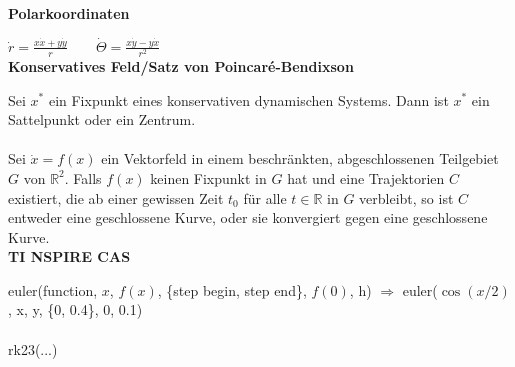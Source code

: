 \textbf{Polarkoordinaten}

$\dot{r} = \frac{x\dot{x} + y \dot{y}}{r} \qquad \dot{\Theta} = \frac{x\dot{y} - y\dot{x}}{r^2}$ \\

\textbf{Konservatives Feld/Satz von Poincaré-Bendixson}

Sei $x^*$ ein Fixpunkt eines konservativen dynamischen Systems. Dann ist $x^*$ ein Sattelpunkt oder ein Zentrum. \\ \\
Sei $\dot{x} = f(x)$ ein Vektorfeld in einem beschränkten, abgeschlossenen Teilgebiet $G$ von $\mathbb{R}^2$. Falls $f(x)$ keinen Fixpunkt in $G$ hat und eine Trajektorien $C$ existiert, die ab einer gewissen Zeit $t_0$ für alle $t\in\mathbb{R}$ in $G$ verbleibt, so ist $C$ entweder eine geschlossene Kurve, oder sie konvergiert gegen eine geschlossene Kurve. \\

\textbf{TI NSPIRE CAS}

euler(function, $x$, $f(x)$, \{step begin, step end\}, $f(0)$, h) $ \Rightarrow$ euler($\cos(x/2)$, x, y, \{0, 0.4\}, 0, 0.1)\\ \\

rk23(...)